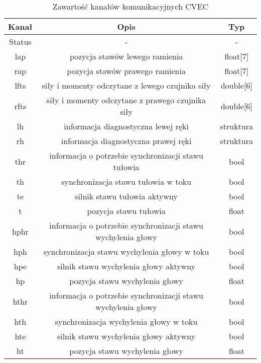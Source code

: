 \documentclass[]{article}
\begin{document}
\begin{table}[H]
	\begin{tabular}{||c|cc||}
		\hline
		Kanał & Opis & Typ \\
		\hline\hline
		Status & - & - \\
		lap & pozycja stawów lewego ramienia & float[7] \\
		rap & pozycja stawów prawego ramienia & float[7] \\
		lfts & siły i momenty odczytane z lewego czujnika siły & double[6] \\
		rfts & siły i momenty odczytane z prawego czujnika siły & double[6] \\
		lh & informacja diagnostyczna lewej ręki & struktura \\
		rh & informacja diagnostyczna prawej ręki & struktura \\
		thr & informacja o potrzebie synchronizacji stawu tułowia & bool  \\
		th & synchronizacja stawu tułowia w toku & bool \\
		te & silnik stawu tułowia aktywny & bool \\
		t & pozycja stawu tułowia & float \\
		hphr & informacja o potrzebie synchronizacji stawu wychylenia głowy & bool \\
		hph & synchronizacja stawu wychylenia głowy w toku & bool \\
		hpe & silnik stawu wychylenia głowy aktywny & bool \\
		hp & pozycja stawu wychylenia głowy & float \\
		hthr & informacja o potrzebie synchronizacji stawu wychylenia głowy & bool \\
		hth & synchronizacja wychylenia głowy w toku & bool \\
		hte & silnik stawu wychylenia głowy aktywny & bool \\
		ht & pozycja stawu wychylenia głowy & float \\
	\end{tabular}
	\caption{Zawartość kanałów komunikacyjnych CVEC}
\end{table}
\end{document}
